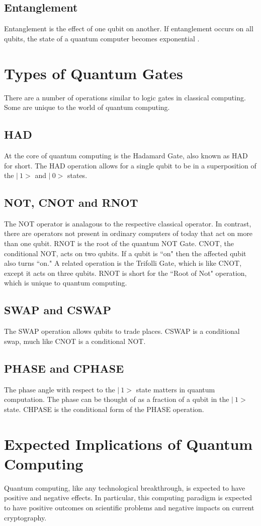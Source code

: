 \documentclass[12pt]{article}
\begin{document}
\begin{flushleft}
\subsection{Entanglement}
Entanglement is the effect of one qubit on another. If entanglement occurs on all qubits, the state of a quantum computer becomes exponential \cite{grumbling_quantum_2019}.

\section{Types of Quantum Gates}
There are a number of operations similar to logic gates in classical computing. Some are unique to the world of quantum computing.
\subsection{HAD}
At the core of quantum computing is the Hadamard Gate, also known as HAD for short. The HAD operation allows for a single qubit to be in a superposition of the $|\ 1 >$ and $| \ 0>$ states.
\subsection{NOT, CNOT and RNOT}
The NOT operator is analagous to the respective classical operator. In contrast, there are operators not present in ordinary computers of today that act on more than one qubit.
RNOT is the root of the quantum NOT Gate.
CNOT, the conditional NOT, acts on two qubits. If a qubit is ``on" then the affected qubit also turns ``on." A related operation is the Trifolli Gate, which is like CNOT, except it acts on three qubits. RNOT is short for the ``Root of Not" operation, which is unique to quantum computing. 
\subsection{SWAP and CSWAP}
The SWAP operation allows qubits to trade places. CSWAP is a conditional swap, much like CNOT is a conditional NOT.
\subsection{PHASE and CPHASE}
The phase angle with respect to the $|\ 1>$ state matters in quantum computation. The phase can be thought of as a fraction of a qubit in the $|\ 1 >$ state. CHPASE is the conditional form of the PHASE operation.

\section{Expected Implications of Quantum Computing}
Quantum computing, like any technological breakthrough, is expected to have positive and negative effects. In particular, this computing paradigm is expected to have positive outcomes on scientific problems and negative impacts on current cryptography. 

\end{flushleft}
\end{document}
